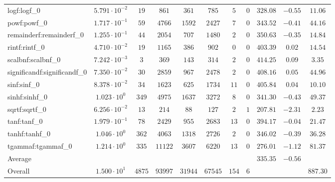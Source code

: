 \begin{tabular}{|l|c|c|c|c|c|c|c|c|c|c|}
logf:logf\_0                 & $ 5.791 \cdot 10^{-2} $ & $ 19     $ & $ 861   $ & $ 361   $ & $ 785   $ & $ 5   $ & $ 0 $ & $ 328.08      $ & $ -0.55   $ & $ 11.06   $ \\
powf:powf\_0                 & $ 1.717 \cdot 10^{-1} $ & $ 59     $ & $ 4766  $ & $ 1592  $ & $ 2427  $ & $ 7   $ & $ 0 $ & $ 343.52      $ & $ -0.41   $ & $ 44.16   $ \\
remainderf:remainderf\_0     & $ 1.255 \cdot 10^{-1} $ & $ 44     $ & $ 2054  $ & $ 707   $ & $ 1480  $ & $ 2   $ & $ 0 $ & $ 350.63      $ & $ -0.35   $ & $ 14.84   $ \\
rintf:rintf\_0               & $ 4.710 \cdot 10^{-2} $ & $ 19     $ & $ 1165  $ & $ 386   $ & $ 902   $ & $ 0   $ & $ 0 $ & $ 403.39      $ & $ 0.02    $ & $ 14.54   $ \\
scalbnf:scalbnf\_0           & $ 7.242 \cdot 10^{-3} $ & $ 3      $ & $ 369   $ & $ 143   $ & $ 314   $ & $ 2   $ & $ 0 $ & $ 414.25      $ & $ 0.09    $ & $ 3.35    $ \\
significandf:significandf\_0 & $ 7.350 \cdot 10^{-2} $ & $ 30     $ & $ 2859  $ & $ 967   $ & $ 2478  $ & $ 2   $ & $ 0 $ & $ 408.16      $ & $ 0.05    $ & $ 44.96   $ \\
sinf:sinf\_0                 & $ 8.378 \cdot 10^{-2} $ & $ 34     $ & $ 1623  $ & $ 625   $ & $ 1734  $ & $ 11  $ & $ 0 $ & $ 405.84      $ & $ 0.04    $ & $ 10.10   $ \\
sinhf:sinhf\_0               & $ 1.023 \cdot 10^{0}  $ & $ 349    $ & $ 4975  $ & $ 1637  $ & $ 3272  $ & $ 8   $ & $ 0 $ & $ 341.30      $ & $ -0.43   $ & $ 49.37   $ \\
sqrtf:sqrtf\_0               & $ 6.256 \cdot 10^{-2} $ & $ 13     $ & $ 214   $ & $ 88    $ & $ 127   $ & $ 2   $ & $ 1 $ & $ 207.81      $ & $ -2.31   $ & $ 2.23    $ \\
tanf:tanf\_0                 & $ 1.979 \cdot 10^{-1} $ & $ 78     $ & $ 2429  $ & $ 955   $ & $ 2683  $ & $ 13  $ & $ 0 $ & $ 394.17      $ & $ -0.04   $ & $ 21.47   $ \\
tanhf:tanhf\_0               & $ 1.046 \cdot 10^{0}  $ & $ 362    $ & $ 4063  $ & $ 1318  $ & $ 2726  $ & $ 2   $ & $ 0 $ & $ 346.02      $ & $ -0.39   $ & $ 36.28   $ \\
tgammaf:tgammaf\_0           & $ 1.214 \cdot 10^{0}  $ & $ 335    $ & $ 11122 $ & $ 3607  $ & $ 6220  $ & $ 13  $ & $ 0 $ & $ 276.01      $ & $ -1.12   $ & $ 81.37   $ \\
\hline
Average                      & $                     $ & $        $ & $       $ & $       $ & $       $ & $     $ & $   $ & $ 335.35      $ & $ -0.56   $ & $         $ \\
\hline
Overall                      & $ 1.500 \cdot 10^{1}  $ & $ 4875   $ & $ 93997 $ & $ 31944 $ & $ 67545 $ & $ 154 $ & $ 6 $ & $             $ & $         $ & $ 887.30  $ \\
\hline
\end{tabular}
